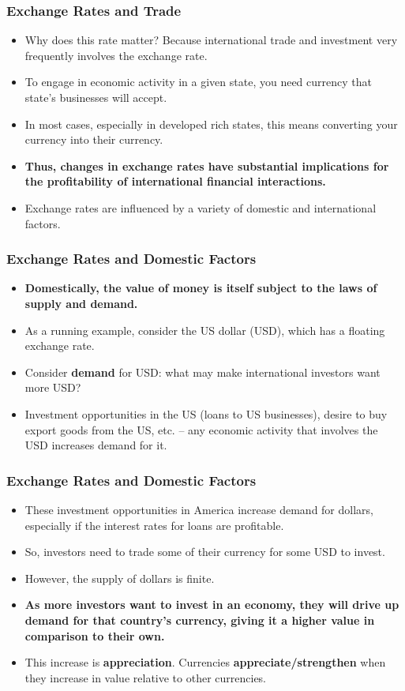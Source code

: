 \documentclass{beamer}
\begin{document}
\begin{frame} 
	\frametitle{\LARGE{Exchange Rates and Trade}}
	\begin{itemize}
		\item Why does this rate matter? Because international trade and investment very frequently involves the exchange rate. \pause
		\item To engage in economic activity in a given state, you need currency that state's businesses will accept. \pause
		\item In most cases, especially in developed rich states, this means converting your currency into their currency. \pause
		\item \textbf{Thus, changes in exchange rates have substantial implications for the profitability of international financial interactions.}
		\item Exchange rates are influenced by a variety of domestic and international factors.
	\end{itemize}
\end{frame}

\begin{frame} 
	\frametitle{\LARGE{Exchange Rates and Domestic Factors}}
	\begin{itemize}
		\item \textbf{Domestically, the value of money is itself subject to the laws of supply and demand.}
		\item As a running example, consider the US dollar (USD), which has a floating exchange rate.
		\item Consider \textbf{demand} for USD: what may make international investors want more USD? \pause
		\item Investment opportunities in the US (loans to US businesses), desire to buy export goods from the US, etc. -- any economic activity that involves the USD increases demand for it.
	\end{itemize}
\end{frame}

\begin{frame} 
	\frametitle{\LARGE{Exchange Rates and Domestic Factors}}
	\begin{itemize}
		\item These investment opportunities in America increase demand for dollars, especially if the interest rates for loans are profitable. \pause
		\item So, investors need to trade some of their currency for some USD to invest. \pause
		\item However, the supply of dollars is finite. \pause
		\item \textbf{As more investors want to invest in an economy, they will drive up demand for that country’s currency, giving it a higher value in comparison to their own.}
		\item This increase is \textbf{appreciation}. Currencies \textbf{appreciate/strengthen} when they increase in value relative to other currencies. 
	\end{itemize}
\end{frame}
\end{document}

